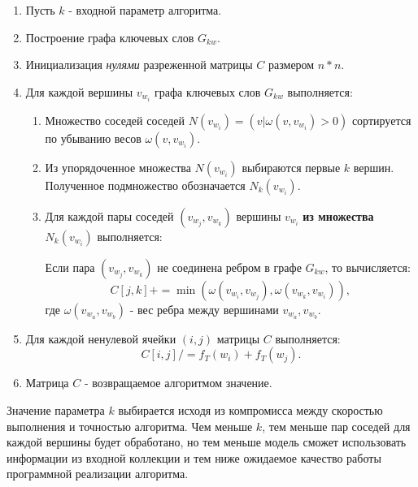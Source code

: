 \begin{enumerate}
    \item Пусть $k$ - входной параметр алгоритма.
    \item Построение графа ключевых слов $G_{kw}$.
    \item Инициализация \emph{нулями} разреженной матрицы $C$ размером $n * n$.
    \item Для каждой вершины $v_{w_i}$ графа ключевых слов $G_{kw}$ выполняется:
        \begin{enumerate}
            \item Множество соседей соседей $N(v_{w_i}) = (v | \omega(v, v_{w_i}) > 0)$ сортируется по убыванию весов $\omega(v, v_{w_i})$.
            \item Из упорядоченное множества $N(v_{w_i})$ выбираются первые $k$ вершин. Полученное подмножество обозначается $N_k(v_{w_i})$.
            \item Для каждой пары соседей $(v_{w_j}, v_{w_k})$ вершины $v_{w_i}$ \textbf{из множества $N_k(v_{w_i})$} выполняется:

                \hspace{30pt} Если пара $(v_{w_j}, v_{w_k})$ не соединена ребром в графе $G_{kw}$, то вычисляется:
                $$ C[j, k] \mathrel{{+}{=}} \min(\omega(v_{w_i}, v_{w_j}), \omega(v_{w_k}, v_{w_i})),$$
                \hspace{30pt}где $\omega(v_{w_a}, v_{w_b})$ - вес ребра между вершинами $v_{w_a}, v_{w_b}$.
        \end{enumerate}
    \item Для каждой ненулевой ячейки $(i, j)$ матрицы $C$ выполняется:
                $$ C[i, j] \mathrel{{/}{=}} f_T(w_i) + f_T(w_j). $$
    \item Матрица $C$ - возвращаемое алгоритмом значение.
\end{enumerate}

Значение параметра $k$ выбирается исходя из компромисса между скоростью выполнения и точностью алгоритма. Чем меньше $k$, тем меньше пар соседей для каждой вершины будет обработано, но тем меньше модель сможет использовать информации из входной коллекции и тем ниже ожидаемое качество работы программной реализации алгоритма.

